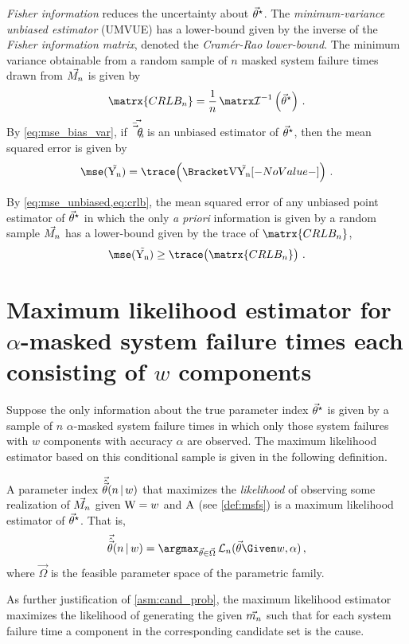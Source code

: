 \documentclass[ ../main.tex]{subfiles}
\begin{document}
\emph{Fisher information} reduces the uncertainty about ${\vec{\theta}}^{\star}$.
The \emph{minimum-variance unbiased estimator} (UMVUE) has a lower-bound given by the inverse of the \emph{Fisher information matrix}, denoted the \emph{Cram\'{e}r-Rao lower-bound}.
The minimum variance obtainable from a random sample of $n$ masked system failure times drawn from $\vec{M_n}$ is given by
\begin{equation}
\label{eq:crlb}
    \matrx{CRLB_n} = \frac{1}{n} \infomatrx^{-1}\left(\tparam\sysparamvec 
    \right)\,.
\end{equation}
By \cref{eq:mse_bias_var}, if $\vec{\bar{\vec{\theta}}_{n}}$ is an unbiased estimator of ${\vec{\theta}}^{\star}$, then the mean squared error is given by
\begin{equation}
\label{eq:mse_unbiased}
\mse(\sampdpt) = \trace\!\left( \Var{\sampdpt}\right)\,.
\end{equation}

By \cref{eq:mse_unbiased,eq:crlb}, the mean squared error of any unbiased point 
estimator of ${\vec{\theta}}^{\star}$ in which the only \emph{a priori} 
information is given by a random sample $\vec{M_n}$ has a lower-bound given by the 
trace of $\matrx{CRLB_n}$,
\begin{equation}
\label{eq:mse_lower_bound_total}
\mse(\sampdpt) \geq \trace\!\left(\matrx{CRLB_n}\right)\,.
\end{equation}

\section{Maximum likelihood estimator for $\alpha$-masked system failure times each consisting of $w$ components}
Suppose the only information about the true parameter index ${\vec{\theta}}^{\star}$ is given by a sample of $n$ $\alpha$-masked system failure times in which only those system failures with $w$ components with accuracy $\alpha$ are observed.
The maximum likelihood estimator based on this conditional sample is given in the following definition.
\begin{definition}
\label{def:general_mle}
A parameter index $\vec{\hat{\vec{\theta}}}(n {\,|\,} w)$ that maximizes the \emph{likelihood} of observing some realization of $\vec{M_n}$ given $\mathrm{W} = w$ and $\mathrm{A}$ (see \cref{def:msfs}) is a maximum likelihood estimator of ${\vec{\theta}}^{\star}$.
That is,
\begin{equation}
\label{eq:general_mle}
\mle = \argmax_{\sysparamvec \in \vec\Omega} \likelihood_n(\sysparamvec \Given w, \alpha)\,,
\end{equation}
where $\vec\Omega$ is the feasible parameter space of the parametric family.
\end{definition}
As further justification of \cref{asm:cand_prob}, the maximum likelihood estimator maximizes the likelihood of generating the given $\vec{m_n}$ such that for each system failure time a component in the corresponding candidate set is the cause.
\end{document}

